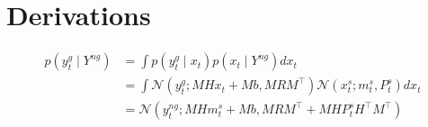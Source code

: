 \documentclass{article}
\newcommand{\norm}[3]{\mathcal{N}\left(#1; #2, #3\right)} %
\let\Oldsection\section
\renewcommand{\section}{\FloatBarrier\Oldsection}
\begin{document}
\section{Derivations}

\setcounter{equation}{0}

\begin{equation}\label{eq:deriv_predictions}
\begin{split}
    p(y_t^g \mid Y^{ng}) &= \int p(y^g_t \mid x_t) p(x_t \mid Y^{ng}) dx_t\\
    & = \int \norm{y_t^g}{MHx_t + Mb}{MRM^\top} \norm{x^s_t}{m^s_t}{P^s_t} dx_t\\
    & = \norm{y^{ng}_t}{MHm^s_t + Mb}{MRM^\top + MHP^s_tH^\top M^\top}
\end{split}
\end{equation}
\end{document}
